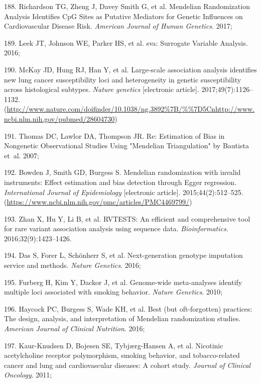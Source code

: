 \documentclass[11pt,oneside]{bristolthesis}
\newenvironment{cslreferences}%
  {}%
  {\par}
\begin{document}
\begin{cslreferences}
\leavevmode\hypertarget{ref-Richardson2017}{}%
188. Richardson TG, Zheng J, Davey Smith G, et al. Mendelian Randomization Analysis Identifies CpG Sites as Putative Mediators for Genetic Influences on Cardiovascular Disease Risk. \emph{American Journal of Human Genetics}. 2017;

\leavevmode\hypertarget{ref-Leek2016}{}%
189. Leek JT, Johnson WE, Parker HS, et al. sva: Surrogate Variable Analysis. 2016;

\leavevmode\hypertarget{ref-McKay2017}{}%
190. McKay JD, Hung RJ, Han Y, et al. Large-scale association analysis identifies new lung cancer susceptibility loci and heterogeneity in genetic susceptibility across histological subtypes. \emph{Nature genetics} {[}electronic article{]}. 2017;49(7):1126--1132. (\url{http://www.nature.com/doifinder/10.1038/ng.3892\%7B/\%\%7D5Cnhttp://www.ncbi.nlm.nih.gov/pubmed/28604730})

\leavevmode\hypertarget{ref-Thomas2007}{}%
191. Thomas DC, Lawlor DA, Thompson JR. Re: Estimation of Bias in Nongenetic Observational Studies Using "Mendelian Triangulation" by Bautista et~al. 2007;

\leavevmode\hypertarget{ref-Bowden2015}{}%
192. Bowden J, Smith GD, Burgess S. Mendelian randomization with invalid instruments: Effect estimation and bias detection through Egger regression. \emph{International Journal of Epidemiology} {[}electronic article{]}. 2015;44(2):512--525. (\url{https://www.ncbi.nlm.nih.gov/pmc/articles/PMC4469799/})

\leavevmode\hypertarget{ref-Zhan2016}{}%
193. Zhan X, Hu Y, Li B, et al. RVTESTS: An efficient and comprehensive tool for rare variant association analysis using sequence data. \emph{Bioinformatics}. 2016;32(9):1423--1426.

\leavevmode\hypertarget{ref-Das2016}{}%
194. Das S, Forer L, Schönherr S, et al. Next-generation genotype imputation service and methods. \emph{Nature Genetics}. 2016;

\leavevmode\hypertarget{ref-Furberg2010}{}%
195. Furberg H, Kim Y, Dackor J, et al. Genome-wide meta-analyses identify multiple loci associated with smoking behavior. \emph{Nature Genetics}. 2010;

\leavevmode\hypertarget{ref-Haycock2016}{}%
196. Haycock PC, Burgess S, Wade KH, et al. Best (but oft-forgotten) practices: The design, analysis, and interpretation of Mendelian randomization studies. \emph{American Journal of Clinical Nutrition}. 2016;

\leavevmode\hypertarget{ref-Kaur-Knudsen2011}{}%
197. Kaur-Knudsen D, Bojesen SE, Tybjærg-Hansen A, et al. Nicotinic acetylcholine receptor polymorphism, smoking behavior, and tobacco-related cancer and lung and cardiovascular diseases: A cohort study. \emph{Journal of Clinical Oncology}. 2011;


\end{cslreferences}
\end{document}
